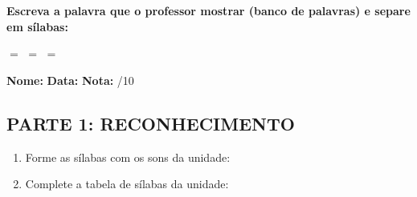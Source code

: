 \noindent\textbf{Escreva a palavra que o professor mostrar (banco de palavras) e separe em sílabas:}

\begin{center}
  \underline{\hspace{2cm}} $=$ \underline{\hspace{2cm}} \quad \underline{\hspace{2cm}} $=$ \underline{\hspace{2cm}} \quad \underline{\hspace{2cm}} $=$ \underline{\hspace{2cm}}
  \end{center}



\begin{exercicio}

\noindent\textbf{Nome:} \underline{\hspace{3.2cm}} \quad \textbf{Data:} \underline{\hspace{1.6cm}} \quad \textbf{Nota:} \underline{\hspace{0.9cm}}/10


\subsection*{PARTE 1: RECONHECIMENTO}

\begin{enumerate}

  \item Forme as sílabas com os sons da unidade:

\begin{center}
\end{center}

  \item Complete a tabela de sílabas da unidade:

\begin{center}
\end{center}


\end{enumerate}
\end{exercicio}
